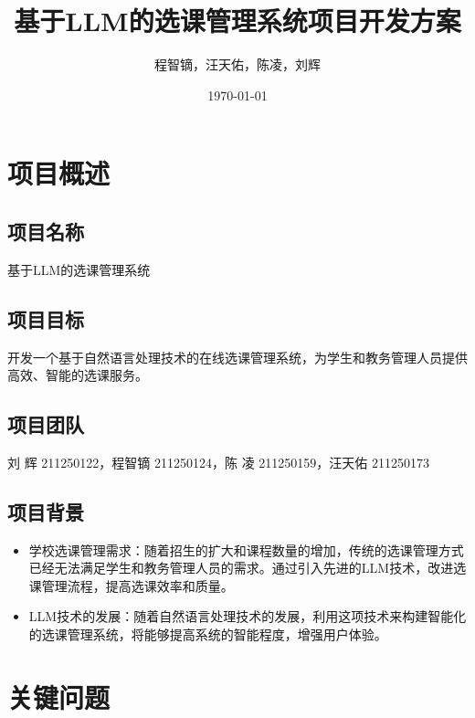 \documentclass{article}
\title{基于LLM的选课管理系统项目开发方案}
\author{程智镝，汪天佑，陈凌，刘辉}
\date{\today}
\begin{document}
\maketitle

\tableofcontents

\newpage

\section{项目概述}

\subsection{项目名称}
基于LLM的选课管理系统

\subsection{项目目标}
开发一个基于自然语言处理技术的在线选课管理系统，为学生和教务管理人员提供高效、智能的选课服务。

\subsection{项目团队}
刘  辉 211250122，程智镝 211250124，陈  凌 211250159，汪天佑 211250173

\subsection{项目背景}
\begin{itemize}
	\item 学校选课管理需求：随着招生的扩大和课程数量的增加，传统的选课管理方式已经无法满足学生和教务管理人员的需求。通过引入先进的LLM技术，改进选课管理流程，提高选课效率和质量。
	\item LLM技术的发展：随着自然语言处理技术的发展，利用这项技术来构建智能化的选课管理系统，将能够提高系统的智能程度，增强用户体验。
\end{itemize}

\section{关键问题}
\end{document}
